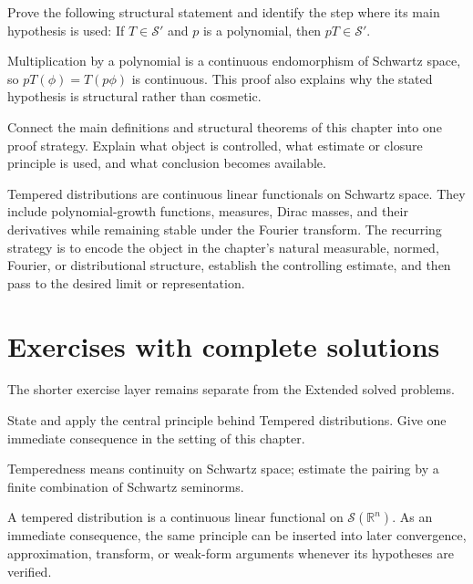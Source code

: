 \begin{problem}\label{prob:iii18-problem-11}
Prove the following structural statement and identify the step where its main hypothesis is used: If $T\in\mathcal S'$ and $p$ is a polynomial, then $pT\in\mathcal S'$.
\end{problem}
\begin{solution}
Multiplication by a polynomial is a continuous endomorphism of Schwartz space, so $pT(\phi)=T(p\phi)$ is continuous. This proof also explains why the stated hypothesis is structural rather than cosmetic.
\end{solution}

\begin{problem}\label{prob:iii18-problem-12}
Connect the main definitions and structural theorems of this chapter into one proof strategy. Explain what object is controlled, what estimate or closure principle is used, and what conclusion becomes available.
\end{problem}
\begin{solution}
Tempered distributions are continuous linear functionals on Schwartz space. They include polynomial-growth functions, measures, Dirac masses, and their derivatives while remaining stable under the Fourier transform. The recurring strategy is to encode the object in the chapter's natural measurable, normed, Fourier, or distributional structure, establish the controlling estimate, and then pass to the desired limit or representation.
\end{solution}
\section{Exercises with complete solutions}
The shorter exercise layer remains separate from the Extended solved problems.

\begin{exercise}\label{exr:iii18-01}
State and apply the central principle behind Tempered distributions. Give one immediate consequence in the setting of this chapter.
\end{exercise}
\begin{hint}
Temperedness means continuity on Schwartz space; estimate the pairing by a finite combination of Schwartz seminorms.
\end{hint}
\begin{solution}
A tempered distribution is a continuous linear functional on $\mathcal S(\mathbb R^n)$. As an immediate consequence, the same principle can be inserted into later convergence, approximation, transform, or weak-form arguments whenever its hypotheses are verified.
\end{solution}

